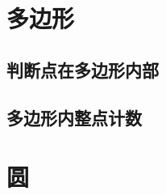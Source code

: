 \documentclass[landscape, oneside, a4paper, cs4size]{book}
\begin{document}
\begin{multicols}{2}
			\section{多边形}
				\subsection{判断点在多边形内部}
				\begin{spacing}{0.8}
					
				\end{spacing}
				\subsection{多边形内整点计数}
				\begin{spacing}{0.8}
					
				\end{spacing}
			\section{圆}

\end{multicols}
\end{document}
